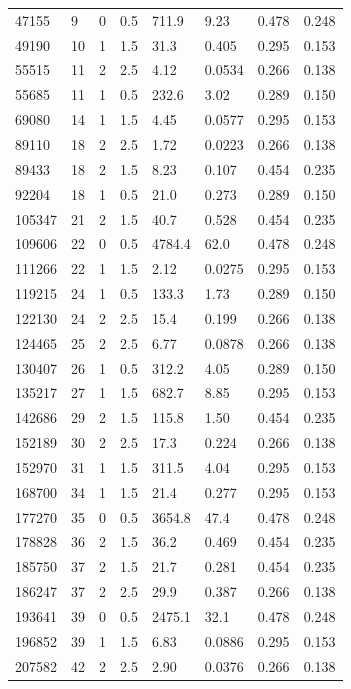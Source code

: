 \documentclass[preview]{standalone}
\begin{document}
{{\begin{tabular}{L{1.2cm}C{1.2cm} C{0.3cm}C{0.5cm} C{1.4cm}C{1.4cm} C{1.4cm}C{1.4cm}}
  47155  &     9  & 0     & 0.5 &  711.9  & 9.23  & 0.478 &  0.248   \\ 
  49190  &    10  & 1     & 1.5 &  31.3  & 0.405  & 0.295 &  0.153   \\ 
  55515  &    11  & 2     & 2.5 &  4.12  & 0.0534  & 0.266 &  0.138   \\ 
  55685  &    11  & 1     & 0.5 &  232.6  & 3.02  & 0.289 &  0.150   \\ 
  69080  &    14  & 1     & 1.5 &  4.45  & 0.0577  & 0.295 &  0.153   \\ 
  89110  &    18  & 2     & 2.5 &  1.72  & 0.0223  & 0.266 &  0.138   \\ 
  89433  &    18  & 2     & 1.5 &  8.23  & 0.107  & 0.454 &  0.235   \\ 
  92204  &    18  & 1     & 0.5 &  21.0  & 0.273  & 0.289 &  0.150   \\ 
  105347  &    21  & 2     & 1.5 &  40.7  & 0.528  & 0.454 &  0.235   \\ 
  109606  &    22  & 0     & 0.5 &  4784.4  & 62.0  & 0.478 &  0.248   \\ 
  111266  &    22  & 1     & 1.5 &  2.12  & 0.0275  & 0.295 &  0.153   \\ 
  119215  &    24  & 1     & 0.5 &  133.3  & 1.73  & 0.289 &  0.150   \\ 
  122130  &    24  & 2     & 2.5 &  15.4  & 0.199  & 0.266 &  0.138   \\ 
  124465  &    25  & 2     & 2.5 &  6.77  & 0.0878  & 0.266 &  0.138   \\ 
  130407  &    26  & 1     & 0.5 &  312.2  & 4.05  & 0.289 &  0.150   \\ 
  135217  &    27  & 1     & 1.5 &  682.7  & 8.85  & 0.295 &  0.153   \\ 
  142686  &    29  & 2     & 1.5 &  115.8  & 1.50  & 0.454 &  0.235   \\ 
  152189  &    30  & 2     & 2.5 &  17.3  & 0.224  & 0.266 &  0.138   \\ 
  152970  &    31  & 1     & 1.5 &  311.5  & 4.04  & 0.295 &  0.153   \\ 
  168700  &    34  & 1     & 1.5 &  21.4  & 0.277  & 0.295 &  0.153   \\ 
  177270  &    35  & 0     & 0.5 &  3654.8  & 47.4  & 0.478 &  0.248   \\ 
  178828  &    36  & 2     & 1.5 &  36.2  & 0.469  & 0.454 &  0.235   \\ 
  185750  &    37  & 2     & 1.5 &  21.7  & 0.281  & 0.454 &  0.235   \\ 
  186247  &    37  & 2     & 2.5 &  29.9  & 0.387  & 0.266 &  0.138   \\ 
  193641  &    39  & 0     & 0.5 &  2475.1  & 32.1  & 0.478 &  0.248   \\ 
  196852  &    39  & 1     & 1.5 &  6.83  & 0.0886  & 0.295 &  0.153   \\ 
  207582  &    42  & 2     & 2.5 &  2.90  & 0.0376  & 0.266 &  0.138   \\ 
\hline 
\end{tabular} 

}}
\end{document}
